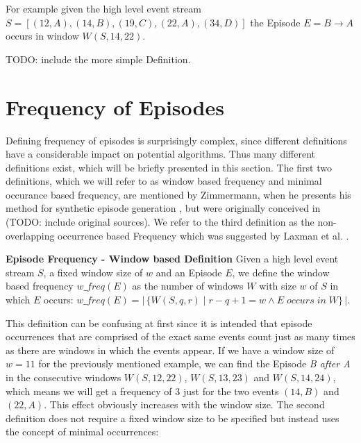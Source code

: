 For example given the high level event stream $S = [ (12,A) , (14,B) , (19,C) , (22,A), (34,D) ]$ the Episode $E = B \rightarrow A$ occurs in window $W(S,14,22)$. \newline \newline 

TODO: include the more simple Definition. \newline \newline


\section{Frequency of Episodes}
Defining frequency of episodes is surprisingly complex, since different definitions have a considerable impact on potential algorithms. Thus many different definitions exist, which will be briefly presented in this section. The first two definitions, which we will refer to as window based frequency and minimal occurance based frequency, are mentioned by Zimmermann, when he presents his method for synthetic episode generation \cite{zimmermann2012generating}, but were originally conceived in (TODO: include original sources). We refer to the third definition as the non-overlapping occurrence based Frequency which was suggested by Laxman et al. \cite{laxman2007fast}.
\begin{mydef}
\textbf{Episode Frequency - Window based Definition} Given a high level event stream $S$, a fixed window size of $w$ and an Episode $E$, we define the window based frequency $w\_freq(E)$ as the number of windows $W$ with size $w$ of $S$ in which $E$ occurs: $w\_freq(E) = |\,\{W(S,q,r) \mid r-q+1 = w \land E \;occurs\; in\; W \}\,|$.
\end{mydef}

This definition can be confusing at first since it is intended that episode occurrences that are comprised of the exact same events count just as many times as there are windows in which the events appear. If we have a window size of $w=11$ for the previously mentioned example, we can find the Episode \textit{B after A} in the consecutive windows $W(S,12,22)$, $W(S,13,23)$ and $W(S,14,24)$, which means we will get a frequency of $3$ just for the two events $(14,B)$ and $(22,A)$. This effect obviously increases with the window size. \newline
The second definition does not require a fixed window size to be specified but instead uses the concept of minimal occurrences:

